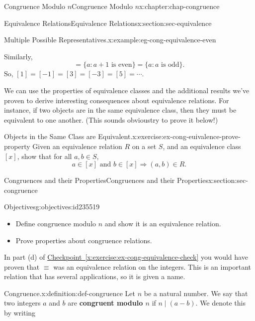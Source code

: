 \documentclass[oneside,10pt,]{book}
\newcommand{\xreffont}{\relax}
\newcommand{\terminology}[1]{\textbf{#1}}
\numberwithin{equation}{section}
\begin{document}
\begin{chapterptx}{Congruence Modulo \(n\)}{}{Congruence Modulo \(n\)}{}{}{x:chapter:chap-congruence}
\begin{sectionptx}{Equivalence Relations}{}{Equivalence Relations}{}{}{x:section:sec-equivalence}
\begin{example}{Multiple Possible Representatives.}{x:example:eg-cong-equivalence-even}
\par
Similarly,%
\begin{equation*}
[1] = \{a : a + 1 \text{ is even}\} = \{ a : a \text{ is odd}\}\text{.}
\end{equation*}
So, \([1] = [-1] = [3] = [-3] = [5] = \cdots\).%
\end{example}
We can use the properties of equivalence classes and the additional results we've proven to derive interesting consequences about equivalence relations. For instance, if two objects are in the same equivalence class, then they must be equivalent to one another. (This sounds obvious\textemdash{}try to prove it below!)%
\begin{inlineexercise}{Objects in the Same Class are Equivalent.}{x:exercise:ex-cong-euivalence-prove-property}%
Given an equivalence relation \(R\) on a set \(S\), and an equivalence class \([x]\), show that for all \(a, b \in S\),%
\begin{equation*}
a \in [x] \text{ and } b \in [x] \Rightarrow (a,b) \in R\text{.}
\end{equation*}
%
\end{inlineexercise}
\end{sectionptx}
%
%
\typeout{************************************************}
\typeout{************************************************}
%
\begin{sectionptx}{Congruences and their Properties}{}{Congruences and their Properties}{}{}{x:section:sec-congruence}
\begin{objectives}{Objectives}{g:objectives:id235519}
%
\begin{itemize}[label=\textbullet]
\item{}Define congruence modulo \(n\) and show it is an equivalence relation.%
\item{}Prove properties about congruence relations.%
\end{itemize}
\end{objectives}
In part (d) of \hyperref[x:exercise:ex-cong-equivalence-check]{Checkpoint~{\xreffont\ref{x:exercise:ex-cong-equivalence-check}}} you would have proven that \(\equiv\) was an equivalence relation on the integers. This is an important relation that has several applications, so it is given a name.%
\begin{definition}{Congruence.}{x:definition:def-congruence}%
Let \(n\) be a natural number. We say that two integers \(a\) and \(b\) are \terminology{congruent modulo \(n\)} if \(n \mid (a-b)\). We denote this by writing%

\end{definition}
\end{sectionptx}
\end{chapterptx}
\end{document}
